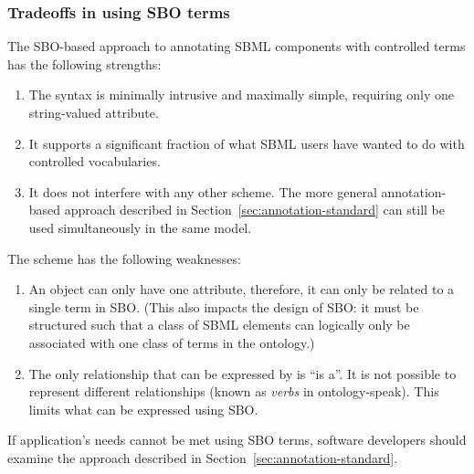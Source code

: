 

\begin{blockChanged}

\subsubsection{Tradeoffs in using SBO terms}

The SBO-based approach to annotating SBML components with
controlled terms has the following strengths:
\begin{enumerate}

\item The syntax is minimally intrusive and maximally simple,
  requiring only one string-valued attribute.

\item It supports a significant fraction of what SBML users have wanted
  to do with controlled vocabularies.

\item It does not interfere with any other scheme.  The more
  general annotation-based approach described in
  Section~\ref{sec:annotation-standard} can still be used
  simultaneously in the same model.

\end{enumerate}

The scheme has the following weaknesses:
\begin{enumerate}

\item An object can only have one  attribute,
  therefore, it can only be related to a single term in SBO.
  (This also impacts the design of SBO: it must be structured such
  that a class of SBML elements can logically only be associated
  with one class of terms in the ontology.)

\item The only relationship that can be expressed by
   is ``is a''.  It is not possible to represent
  different relationships (known as \emph{verbs} in
  ontology-speak).  This limits what can be expressed using SBO.

\end{enumerate}

  If application's
needs cannot be met using SBO terms, software developers should
examine the approach described in
Section~\ref{sec:annotation-standard}.


\end{blockChanged}
